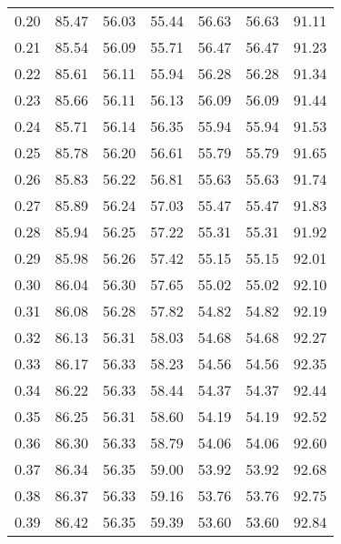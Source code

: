\begin{tabular}{|c|c|c|c|c|c|c|}
      0.20 &     85.47 &     56.03 &      55.44 &   56.63 &      56.63 &         91.11 \\
      0.21 &     85.54 &     56.09 &      55.71 &   56.47 &      56.47 &         91.23 \\
      0.22 &     85.61 &     56.11 &      55.94 &   56.28 &      56.28 &         91.34 \\
      0.23 &     85.66 &     56.11 &      56.13 &   56.09 &      56.09 &         91.44 \\
      0.24 &     85.71 &     56.14 &      56.35 &   55.94 &      55.94 &         91.53 \\
      0.25 &     85.78 &     56.20 &      56.61 &   55.79 &      55.79 &         91.65 \\
      0.26 &     85.83 &     56.22 &      56.81 &   55.63 &      55.63 &         91.74 \\
      0.27 &     85.89 &     56.24 &      57.03 &   55.47 &      55.47 &         91.83 \\
      0.28 &     85.94 &     56.25 &      57.22 &   55.31 &      55.31 &         91.92 \\
      0.29 &     85.98 &     56.26 &      57.42 &   55.15 &      55.15 &         92.01 \\
      0.30 &     86.04 &     56.30 &      57.65 &   55.02 &      55.02 &         92.10 \\
      0.31 &     86.08 &     56.28 &      57.82 &   54.82 &      54.82 &         92.19 \\
      0.32 &     86.13 &     56.31 &      58.03 &   54.68 &      54.68 &         92.27 \\
      0.33 &     86.17 &     56.33 &      58.23 &   54.56 &      54.56 &         92.35 \\
      0.34 &     86.22 &     56.33 &      58.44 &   54.37 &      54.37 &         92.44 \\
      0.35 &     86.25 &     56.31 &      58.60 &   54.19 &      54.19 &         92.52 \\
      0.36 &     86.30 &     56.33 &      58.79 &   54.06 &      54.06 &         92.60 \\
      0.37 &     86.34 &     56.35 &      59.00 &   53.92 &      53.92 &         92.68 \\
      0.38 &     86.37 &     56.33 &      59.16 &   53.76 &      53.76 &         92.75 \\
      0.39 &     86.42 &     56.35 &      59.39 &   53.60 &      53.60 &         92.84 \\

\end{tabular}

